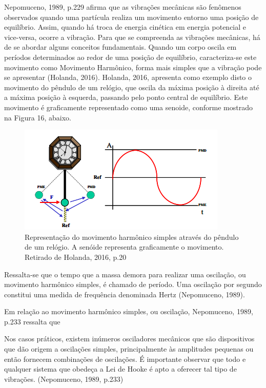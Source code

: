 \documentclass[
	12pt,				
	oneside,			
	a4paper,			
	english,			
	brazil				
	]{abntex2ppgsi}
\begin{document}
Nepomuceno, 1989, p.229 afirma que as vibrações mecânicas são fenômenos observados quando uma partícula realiza um movimento entorno uma posição de equilíbrio. Assim, quando há troca de energia cinética em energia potencial e vice-versa, ocorre a vibração. 
Para que se compreenda as vibrações mecânicas, há de se abordar alguns conceitos fundamentais. 
Quando um corpo oscila em períodos determinados ao redor de uma posição de equilíbrio, caracteriza-se este movimento como Movimento Harmônico, forma mais simples que a vibração pode se apresentar (Holanda, 2016). Holanda, 2016, apresenta como exemplo disto o movimento do pêndulo de um relógio, que oscila da máxima posição à direita até a máxima posição à esquerda, passando pelo ponto central de equilíbrio. Este movimento é graficamente representado como uma senoide, conforme mostrado na Figura 16, abaixo.

\begin{figure}[!htb]
\centering
\includegraphics{Figura16}
\caption {Representação do movimento harmônico simples através do pêndulo de um relógio. A senóide representa graficamente o movimento. Retirado de Holanda, 2016, p.20}
\label{Figura16}
\end{figure}

Ressalta-se que o tempo que a massa demora para realizar uma oscilação, ou movimento harmônico simples, é chamado de período. Uma oscilação por segundo constitui uma medida de frequência denominada Hertz (Nepomuceno, 1989). 

Em relação ao movimento harmônico simples, ou oscilação, Nepomuceno, 1989, p.233 ressalta que

\begin{citacao}
Nos casos práticos, existem inúmeros osciladores mecânicos que são dispositivos que dão origem a oscilações simples, principalmente às amplitudes pequenas ou então fornecem combinações de oscilações. É importante observar que todo e qualquer sistema que obedeça a Lei de Hooke é apto a oferecer tal tipo de vibrações. (Nepomuceno, 1989, p.233)
\end{citacao}
\end{document}
